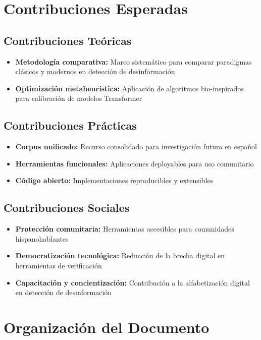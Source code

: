 \section{Contribuciones Esperadas}

\subsection{Contribuciones Teóricas}
\begin{itemize}
    \item \textbf{Metodología comparativa:} Marco sistemático para comparar paradigmas clásicos y modernos en detección de desinformación
    \item \textbf{Optimización metaheurística:} Aplicación de algoritmos bio-inspirados para calibración de modelos Transformer
\end{itemize}

\subsection{Contribuciones Prácticas}
\begin{itemize}
    \item \textbf{Corpus unificado:} Recurso consolidado para investigación futura en español
    \item \textbf{Herramientas funcionales:} Aplicaciones deployables para uso comunitario
    \item \textbf{Código abierto:} Implementaciones reproducibles y extensibles
\end{itemize}

\subsection{Contribuciones Sociales}
\begin{itemize}
    \item \textbf{Protección comunitaria:} Herramientas accesibles para comunidades hispanohablantes
    \item \textbf{Democratización tecnológica:} Reducción de la brecha digital en herramientas de verificación
    \item \textbf{Capacitación y concientización:} Contribución a la alfabetización digital en detección de desinformación
\end{itemize}

\section{Organización del Documento}

